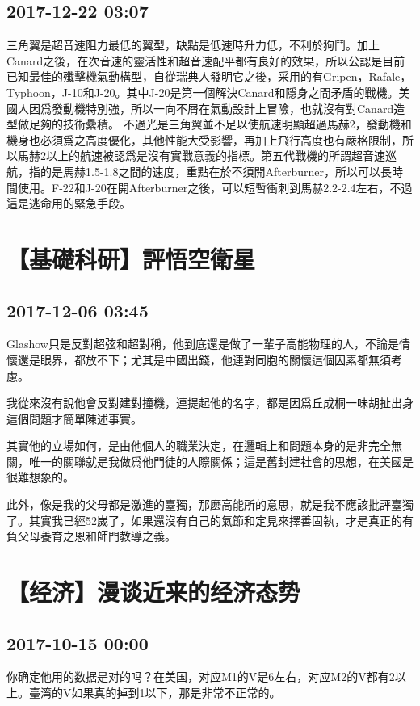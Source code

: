 \documentclass[twocolumn]{ctexart}
\begin{document}
\subsection*{2017-12-22 03:07}

三角翼是超音速阻力最低的翼型，缺點是低速時升力低，不利於狗鬥。加上Canard之後，在次音速的靈活性和超音速配平都有良好的效果，所以公認是目前已知最佳的殲擊機氣動構型，自從瑞典人發明它之後，采用的有Gripen，Rafale，Typhoon，J-10和J-20。其中J-20是第一個解決Canard和隱身之間矛盾的戰機。美國人因爲發動機特別強，所以一向不屑在氣動設計上冒險，也就沒有對Canard造型做足夠的技術纍積。
不過光是三角翼並不足以使航速明顯超過馬赫2，發動機和機身也必須爲之高度優化，其他性能大受影響，再加上飛行高度也有嚴格限制，所以馬赫2以上的航速被認爲是沒有實戰意義的指標。第五代戰機的所謂超音速巡航，指的是馬赫1.5-1.8之間的速度，重點在於不須開Afterburner，所以可以長時間使用。F-22和J-20在開Afterburner之後，可以短暫衝刺到馬赫2.2-2.4左右，不過這是逃命用的緊急手段。
\section*{【基礎科研】評悟空衛星}
\subsection*{2017-12-06 03:45}

Glashow只是反對超弦和超對稱，他到底還是做了一輩子高能物理的人，不論是情懷還是眼界，都放不下；尤其是中國出錢，他連對同胞的關懷這個因素都無須考慮。 
 
我從來沒有說他會反對建對撞機，連提起他的名字，都是因爲丘成桐一味胡扯出身這個問題才簡單陳述事實。 
 
其實他的立場如何，是由他個人的職業決定，在邏輯上和問題本身的是非完全無關，唯一的關聯就是我做爲他門徒的人際關係；這是舊封建社會的思想，在美國是很難想象的。 
 
此外，像是我的父母都是激進的臺獨，那麽高能所的意思，就是我不應該批評臺獨了。其實我已經52嵗了，如果還沒有自己的氣節和定見來擇善固執，才是真正的有負父母養育之恩和師門教導之義。
\section*{【经济】漫谈近来的经济态势}
\subsection*{2017-10-15 00:00}
你确定他用的数据是对的吗？在美国，对应M1的V是6左右，对应M2的V都有2以上。臺湾的V如果真的掉到1以下，那是非常不正常的。
\end{document}
